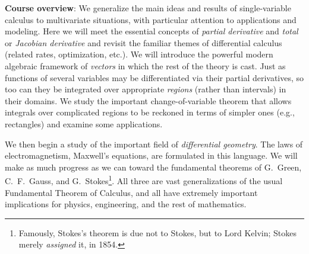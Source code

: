 \documentclass[12pt,twoside]{amsart}
\begin{document}
\textbf{Course overview}: We generalize the main ideas and results of single-variable calculus to multivariate situations, with particular attention to applications and modeling. 
Here we will meet the essential concepts of \emph{partial derivative} and \emph{total} or \emph{Jacobian derivative} and revisit the familiar themes of differential calculus (related rates, optimization, etc.). We will introduce the powerful modern algebraic framework of \emph{vectors} in which the rest of the theory is cast.
Just as functions of several variables may be differentiated via their partial derivatives, so too can they be integrated over appropriate \emph{regions} (rather than intervals) in their domains. We study the important change-of-variable theorem that allows integrals over complicated regions to be reckoned in terms of simpler ones (e.g., rectangles) and examine some applications. 

We then begin a study of the important field of \emph{differential geometry}. The laws of electromagnetism, Maxwell's equations, are formulated in this language. We will make as much progress as we can toward the fundamental theorems of G.\ Green, C.\ F.\ Gauss, and G.\ Stokes\footnote{Famously, Stokes's theorem is due not to Stokes, but to Lord Kelvin; Stokes merely \emph{assigned} it, in 1854.}. All three are vast generalizations of the usual Fundamental Theorem of Calculus, and all have extremely important implications for physics, engineering, and the rest of mathematics.
\end{document}
